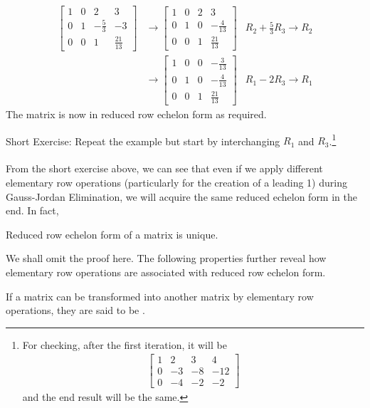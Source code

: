 \begin{solution}
\begin{align*}
\begin{bmatrix}
1 & 0 & 2 & 3 \\
0 & 1 & -\frac{5}{3} & -3 \\
0 & 0 & 1 & \frac{21}{13}
\end{bmatrix} 
&\to
\begin{bmatrix}
1 & 0 & 2 & 3 \\
0 & 1 & 0 & -\frac{4}{13} \\
0 & 0 & 1 & \frac{21}{13}
\end{bmatrix} 
& R_2 + \frac{5}{3}R_3 \to R_2 \\
&\to
\begin{bmatrix}
1 & 0 & 0 & -\frac{3}{13} \\
0 & 1 & 0 & -\frac{4}{13} \\
0 & 0 & 1 & \frac{21}{13}
\end{bmatrix} 
& R_1 - 2R_3 \to R_1
\end{align*}
The matrix is now in reduced row echelon form as required.
\end{solution}
Short Exercise: Repeat the example but start by interchanging $R_1$ and $R_3$.\footnote{For checking, after the first iteration, it will be
\begin{align*}
\begin{bmatrix}
1 & 2 & 3 & 4 \\
0 & -3 & -8 & -12 \\
0 & -4 & -2 & -2
\end{bmatrix}    
\end{align*}
and the end result will be the same.}\\
\\
From the short exercise above, we can see that even if we apply different elementary row operations (particularly for the creation of a leading 1) during Gauss-Jordan Elimination, we will acquire the same reduced echelon form in the end. In fact,
\begin{thm}
\label{uniquerref}
Reduced row echelon form of a matrix is unique.
\end{thm}
We shall omit the proof here. The following properties further reveal how elementary row operations are associated with reduced row echelon form.
\begin{proper}
\label{proper:rowequiv}
If a matrix can be transformed into another matrix by elementary row operations, they are said to be .
\end{proper}
